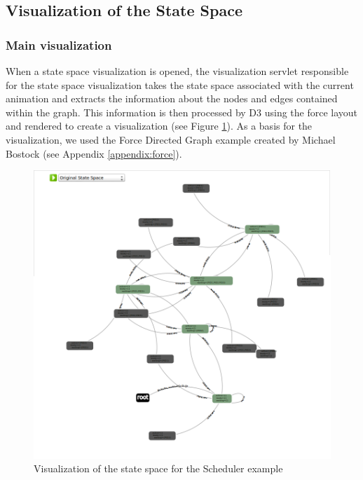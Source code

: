 \subsection{Visualization of the State Space}

\subsubsection{Main visualization}

When a state space visualization is opened, the visualization servlet responsible for the state space visualization takes the state space associated with the current animation and extracts the information about the nodes and edges contained within the graph. This information is then processed by D3 using the force layout and rendered to create a visualization (see Figure \ref{zoomedOut}). As a basis for the visualization, we used the Force Directed Graph example created by Michael Bostock (see Appendix \ref{appendix:force}). 

\begin{center}
\begin{figure}[h!]
\includegraphics[width=13cm]{bilder/ss-zoomedOut.png}
\caption{Visualization of the state space for the Scheduler example}
\label{zoomedOut}
\end{figure}
\end{center}

